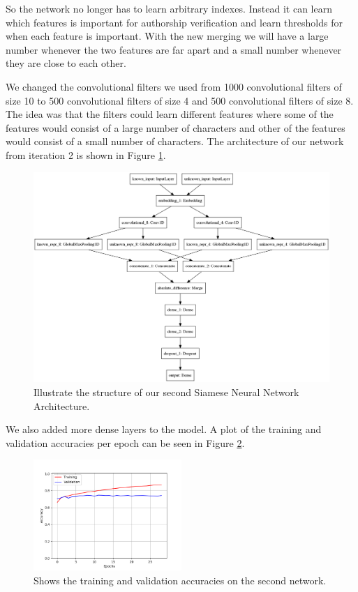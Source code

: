 So the network no longer has to learn arbitrary indexes. Instead it can learn
which features is important for authorship verification and learn thresholds for
when each feature is important. With the new merging we will have a large number
whenever the two features are far apart and a small number whenever they are
close to each other.

We changed the convolutional filters we used from 1000 convolutional filters of
size 10 to 500 convolutional filters of size 4 and 500 convolutional filters of
size 8. The idea was that the filters could learn different features where some
of the features would consist of a large number of characters and other of the
features would consist of a small number of characters. The architecture of our
network from iteration 2 is shown in Figure \ref{fig:network_2}.

\begin{figure}
    \centering
    \includegraphics[width=\textwidth]{./pictures/experiments/network2.png}
    \caption{Illustrate the structure of our second Siamese Neural Network
        Architecture.}
    \label{fig:network_2}
\end{figure}

We also added more dense layers to the model. A plot of the
training and validation accuracies per epoch can be seen in Figure
\ref{fig:network2_accuracies}.

\begin{figure}
    \centering
    \includegraphics[width=0.5\textwidth]{./pictures/experiments/network_2_accuracies.png}
    \caption{Shows the training and validation accuracies on the second
        network.}
    \label{fig:network2_accuracies}
\end{figure}

